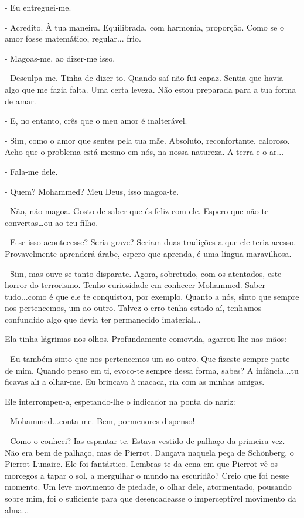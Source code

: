 - Eu entreguei-me.

- Acredito. À tua maneira. Equilibrada, com harmonia, proporção. Como se
o amor fosse matemático, regular... frio.

- Magoas-me, ao dizer-me isso.

- Desculpa-me. Tinha de dizer-to. Quando saí não fui capaz. Sentia que
havia algo que me fazia falta. Uma certa leveza. Não estou preparada
para a tua forma de amar.

- E, no entanto, crês que o meu amor é inalterável.

- Sim, como o amor que sentes pela tua mãe. Absoluto, reconfortante,
caloroso. Acho que o problema está mesmo em nós, na nossa natureza. A
terra e o ar...

- Fala-me dele.

- Quem? Mohammed? Meu Deus, isso magoa-te.

- Não, não magoa. Gosto de saber que és feliz com ele. Espero que não te
convertas\ldots{}ou ao teu filho.

- E se isso acontecesse? Seria grave? Seriam duas tradições a que ele
teria acesso. Provavelmente aprenderá árabe, espero que aprenda, é uma
língua maravilhosa.

- Sim, mas ouve-se tanto disparate. Agora, sobretudo, com os atentados,
este horror do terrorismo. Tenho curiosidade em conhecer Mohammed. Saber
tudo...como é que ele te conquistou, por exemplo. Quanto a nós, sinto
que sempre nos pertencemos, um ao outro. Talvez o erro tenha estado aí,
tenhamos confundido algo que devia ter permanecido imaterial...

Ela tinha lágrimas nos olhos. Profundamente comovida, agarrou-lhe nas
mãos:

- Eu também sinto que nos pertencemos um ao outro. Que fizeste sempre
parte de mim. Quando penso em ti, evoco-te sempre dessa forma, sabes? A
infância...tu ficavas ali a olhar-me. Eu brincava à macaca, ria com as
minhas amigas.

Ele interrompeu-a, espetando-lhe o indicador na ponta do nariz:

- Mohammed...conta-me. Bem, pormenores dispenso!

- Como o conheci? Ias espantar-te. Estava vestido de palhaço da primeira
vez. Não era bem de palhaço, mas de Pierrot. Dançava naquela peça de
Schönberg, o Pierrot Lunaire. Ele foi fantástico. Lembras-te da cena em
que Pierrot vê os morcegos a tapar o sol, a mergulhar o mundo na
escuridão? Creio que foi nesse momento. Um leve movimento de piedade, o
olhar dele, atormentado, pousando sobre mim, foi o suficiente para que
desencadeasse o imperceptível movimento da alma...

